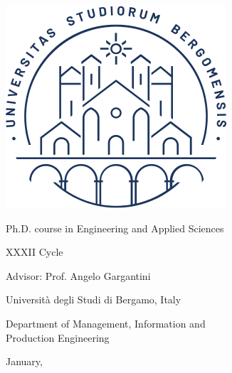 \begin{titlepage}
  \begin{center}
    \includegraphics[scale=0.5]{images/sigillo.png}
    
    \vspace{1cm}
    
    
    \vspace{1cm}
    
	{\huge \bfseries \ttitle\par}\vspace{0.4cm} %
	
    \vspace{1.5cm}
    
    {\huge \authorname}
    
    \vspace{.2cm}
    
    {\large Ph.D. course in Engineering and Applied Sciences}

	XXXII Cycle
    
    \vspace{\fill}
    
    {\large Advisor: Prof. Angelo Gargantini \\}
    
   
    
    \vspace{0.3cm}
    
    \vspace{\fill}
    
    {\large Universit\`a degli Studi di Bergamo, Italy
    
   Department of Management, Information and \\Production Engineering\\}
    
    \vspace{.5cm}
    
    {\large
    	January, \number\year
    }
        
  \end{center}
\end{titlepage}


